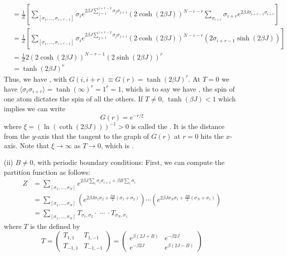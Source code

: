 \documentclass[12pt, a4paper, oneside, openright, titlepage]{book}
\begin{document}
\begin{eg}
\begin{itemize}
\begin{align*}
                &= \frac{1}{Z}\left[\sum_{[\sigma_1,...,\sigma_{i+r-1}]}\sigma_ie^{2\beta J\sum_{j=1}^{i+r-2}\sigma_j\sigma_{j+1}}(2\cosh(2\beta J))^{N-i-r}\sum_{\sigma_{i+r}}\sigma_{i+r}e^{2\beta J\sigma_{i+r-1}\sigma_{i+r}}\right] \\
                &= \frac{1}{Z}\left[\sum_{[\sigma_1,...,\sigma_{i+r-1}]}\sigma_ie^{2\beta J\sum_{j=1}^{i+r-2}\sigma_j\sigma_{j+1}}(2\cosh(2\beta J))^{N-i-r}(2\sigma_{i+r-1}\sinh(2\beta J))\right] \\
                &= \frac{1}{Z}2(2\cosh(2\beta J))^{N-r-1}(2\sinh(2\beta J))^r \\
                &= \tanh(2\beta J)^r 
            \end{align*}
            Thus, we have , with $G(i,i+r) \equiv G(r) = \tanh(2\beta J)^r$. At $T = 0$ we have $\langle \sigma_i\sigma_{i+r}\rangle = \tanh(\infty)^r = 1^r = 1$, which is to say we have , the spin of one atom dictates the spin of all the others. If $T \neq 0$, $\tanh(\beta J) < 1$ which implies we can write $$G(r) = e^{-r/\xi}$$ where $\xi =(\ln(\coth(2\beta J)))^{-1} > 0$ is called the . It is the distance from the $y$-axis that the tangent to the graph of $G(r)$ at $r = 0$ hits the $x$-axis. Note that $\xi\rightarrow \infty$ as $T\rightarrow 0$, which is .
        \item[(ii)] $B \neq 0$, with periodic boundary conditions: First, we can compute the partition function as follows: \begin{align*}
                Z &= \sum_{[\sigma_1,...,\sigma_N]}e^{2\beta J\sum_i\sigma_i\sigma_{i+1}+\beta B\sum_i\sigma_i} \\
                &= \sum_{[\sigma_1,...,\sigma_N]}\left(e^{2\beta J\sigma_1\sigma_2 + \frac{\beta B}{2}(\sigma_1+\sigma_2)}\right)\cdots \left(e^{2\beta J\sigma_N\sigma_1 + \frac{\beta B}{2}(\sigma_N+\sigma_1)}\right) \\
                &= \sum_{[\sigma_1,...,\sigma_N]}T_{\sigma_1,\sigma_2}\cdot \;\cdots \;\cdot T_{\sigma_N,\sigma_1}
        \end{align*}
            where $T$ is the  defined by \begin{equation*}
                T = \begin{pmatrix} T_{1,1} & T_{1,-1} \\ T_{-1,1} & T_{-1,-1} \end{pmatrix} = \begin{pmatrix} e^{\beta(2J+B)} & e^{-\beta 2J} \\ e^{-\beta 2J} & e^{\beta (2J-B)} \end{pmatrix}

\end{equation*}
\end{itemize}
\end{eg}
\end{document}
